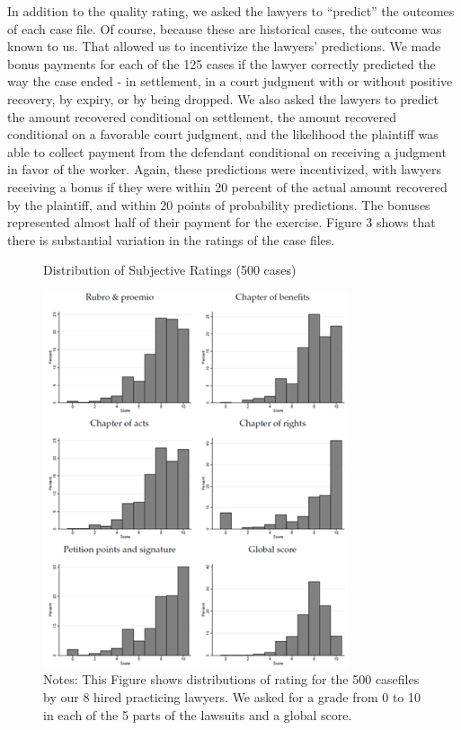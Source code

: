 \documentclass[12 pt]{article}
\begin{document}
In addition to the quality rating, we asked the lawyers to “predict” the outcomes of each case file. Of course, because these are historical cases, the outcome was known to us. That allowed us to incentivize the lawyers’ predictions. We made bonus payments for each of the 125 cases if the lawyer correctly predicted the way the case ended - in settlement, in a court judgment with or without positive recovery, by expiry, or by being dropped. We also asked the lawyers to predict the amount recovered conditional on settlement, the amount recovered conditional on a favorable court judgment, and the likelihood the plaintiff was able to collect payment from the defendant conditional on receiving a judgment in favor of the worker. Again, these predictions were incentivized, with lawyers receiving a bonus if they were within 20 percent of the actual amount recovered by the plaintiff, and within 20 points of probability predictions. The bonuses represented almost half of their payment for the exercise. Figure 3 shows that there is substantial variation in the ratings of the case files. 

\begin{figure}[hp]%
 \centering
 \caption{Distribution of Subjective Ratings (500 cases)}
 \includegraphics[width=0.8\textwidth]{Figures/Figure3.png}
 \caption*{Notes: This Figure shows distributions of rating for the 500 casefiles by our 8 hired practicing lawyers. We asked for a grade from 0 to 10 in each of the 5 parts of the lawsuits and a global score.}
 \label{fig:3}
\end{figure}%
\end{document}
